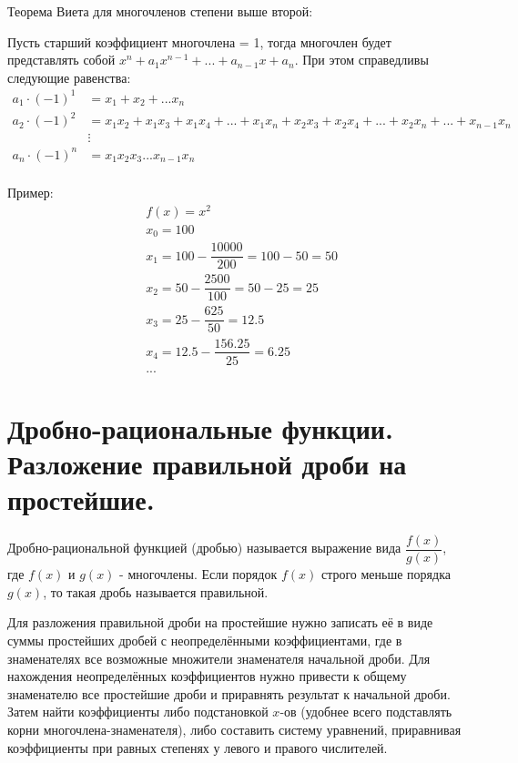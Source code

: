 \documentclass[12pt]{article}
\begin{document}
\begin{sloppypar}
    Теорема Виета для многочленов степени выше второй:

    Пусть старший коэффициент многочлена = 1, тогда многочлен будет представлять собой $x^n + a_{1}x^{n - 1} + ... + a_{n-1}x + a_n$. При этом справедливы следующие равенства:
    \[
        \begin{array}{ll}
            a_{1}\cdot(-1)^{1} & = x_1 + x_2 + ... x_n                                                                           \\
            a_{2}\cdot(-1)^{2} & = x_1x_2 + x_1x_3 + x_1x_4 + ... + x_1x_n + x_2x_3 + x_2x_4 + ... + x_2x_n + ... + x_{n - 1}x_n \\
                               & \vdots                                                                                          \\
            a_{n}\cdot(-1)^{n} & = x_1x_2x_3 ... x_{n-1}x_n                                                                      \\
        \end{array}
    \]

    Пример:
    \begin{align*}
         & f(x) = x^2                                     \\
         & x_0 = 100                                      \\
         & x_1 = 100 - \dfrac{10000}{200} = 100 - 50 = 50 \\
         & x_2 = 50 - \dfrac{2500}{100} = 50 - 25 = 25    \\
         & x_3 = 25 - \dfrac{625}{50} = 12.5              \\
         & x_4 = 12.5 - \dfrac{156.25}{25} = 6.25         \\
         & ...
    \end{align*}

    \section{Дробно-рациональные функции. Разложение правильной дроби на простейшие.}
    Дробно-рациональной функцией (дробью) называется выражение вида $\dfrac{f(x)}{g(x)}$, где $f(x)$ и $g(x)$ - многочлены. Если порядок $f(x)$ строго меньше порядка $g(x)$, то такая дробь называется правильной.

    Для разложения правильной дроби на простейшие нужно записать её в виде суммы простейших дробей с неопределёнными коэффициентами, где в знаменателях все возможные множители знаменателя начальной дроби.
    Для нахождения неопределённых коэффициентов нужно привести к общему знаменателю все простейшие дроби и приравнять результат к начальной дроби. Затем найти коэффициенты либо подстановкой $x$-ов (удобнее всего подставлять корни многочлена-знаменателя), либо составить систему уравнений, приравнивая коэффициенты при равных степенях у левого и правого числителей.


\end{sloppypar}
\end{document}
